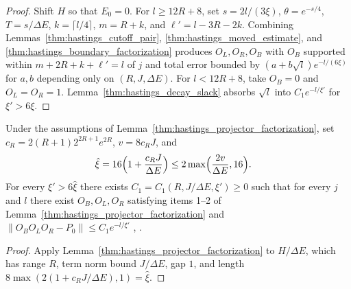 \begin{proof}\leanok
    Shift $H$ so that $E_0=0$. For $l\ge12R+8$, set $s=2l/(3\xi)$,
    $\theta=e^{-s/4}$, $T=s/\Delta E$, $k=\lceil l/4\rceil$, $m=R+k$, and
    $\ell'=l-3R-2k$. Combining Lemmas~\ref{thm:hastings_cutoff_pair},
    \ref{thm:hastings_moved_estimate}, and
    \ref{thm:hastings_boundary_factorization} produces $O_L,O_R,O_B$ with $O_B$
    supported within $m+2R+k+\ell'=l$ of $j$ and total error bounded by
    $(a+b\sqrt l)e^{-l/(6\xi)}$ for $a,b$ depending only on $(R,J,\Delta E)$.
    For $l<12R+8$, take $O_B=0$ and $O_L=O_R=1$. Lemma~\ref{thm:hastings_decay_slack}
    absorbs $\sqrt l$ into $C_1e^{-l/\xi'}$ for $\xi'>6\xi$.
\end{proof}

\begin{lemma}
    \label{thm:hastings_projector_factorization_scaled}
    \leanok
    Under the assumptions of Lemma~\ref{thm:hastings_projector_factorization},
    set $c_R=2(R+1)2^{2R+1}e^{2R}$, $v=8c_RJ$, and
    \begin{align}
        \hat\xi & =16\Bigl(1+\frac{c_RJ}{\Delta E}\Bigr)
        \le2\max\Bigl(\frac{2v}{\Delta E},16\Bigr).
        \label{eq:hastings_lemma1_hat_xi}
    \end{align}
    For every $\xi'>6\hat\xi$ there exists $C_1=C_1(R,J/\Delta E,\xi')\ge0$
    such that for every $j$ and $l$ there exist $O_B,O_L,O_R$ satisfying items
    1--2 of Lemma~\ref{thm:hastings_projector_factorization} and
    $\|O_BO_LO_R-P_0\|\le C_1e^{-l/\xi'}$
    \cite[lines 96--112, 139--142]{Hastings2007AreaLaw},
    \cite{gap:hastings07_lemma1_decay_length}.
\end{lemma}
\begin{proof}\leanok
    Apply Lemma~\ref{thm:hastings_projector_factorization} to $H/\Delta E$,
    which has range $R$, term norm bound $J/\Delta E$, gap $1$, and length
    $8\max(2(1+c_RJ/\Delta E),1)=\hat\xi$.
\end{proof}

